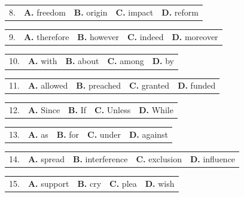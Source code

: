 \documentclass[UTF8,11pt]{ctexart}
\begin{document}
\noindent\begin{tabularx}{\linewidth}{@{}lXXXX@{}}8. & \textbf{A.} freedom & \textbf{B.} origin & \textbf{C.} impact & \textbf{D.} reform\\\end{tabularx}\par

\noindent\begin{tabularx}{\linewidth}{@{}lXXXX@{}}9. & \textbf{A.} therefore & \textbf{B.} however & \textbf{C.} indeed & \textbf{D.} moreover\\\end{tabularx}\par

\noindent\begin{tabularx}{\linewidth}{@{}lXXXX@{}}10. & \textbf{A.} with & \textbf{B.} about & \textbf{C.} among & \textbf{D.} by\\\end{tabularx}\par

\noindent\begin{tabularx}{\linewidth}{@{}lXXXX@{}}11. & \textbf{A.} allowed & \textbf{B.} preached & \textbf{C.} granted & \textbf{D.} funded\\\end{tabularx}\par

\noindent\begin{tabularx}{\linewidth}{@{}lXXXX@{}}12. & \textbf{A.} Since & \textbf{B.} If & \textbf{C.} Unless & \textbf{D.} While\\\end{tabularx}\par

\noindent\begin{tabularx}{\linewidth}{@{}lXXXX@{}}13. & \textbf{A.} as & \textbf{B.} for & \textbf{C.} under & \textbf{D.} against\\\end{tabularx}\par

\noindent\begin{tabularx}{\linewidth}{@{}lXXXX@{}}14. & \textbf{A.} spread & \textbf{B.} interference & \textbf{C.} exclusion & \textbf{D.} influence\\\end{tabularx}\par

\noindent\begin{tabularx}{\linewidth}{@{}lXXXX@{}}15. & \textbf{A.} support & \textbf{B.} cry & \textbf{C.} plea & \textbf{D.} wish\\\end{tabularx}\par
\end{document}
